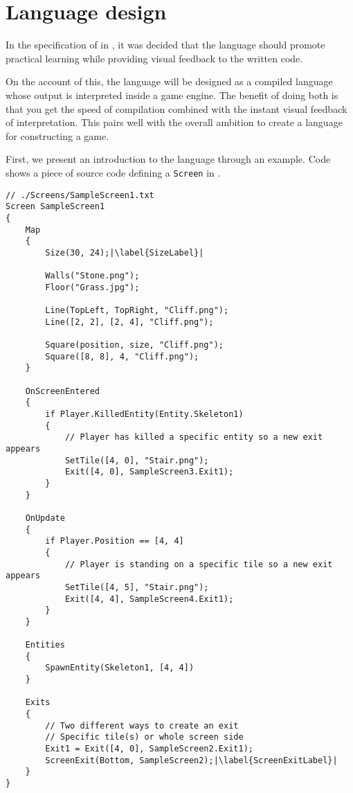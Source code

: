 \chapter{Language design}\label{chap:language_design}
In the specification of \dazel{} in , it was decided that the language should promote practical learning while providing visual feedback to the written code. 

On the account of this, the \dazel{} language will be designed as a compiled language whose output is interpreted inside a game engine.
The benefit of doing both is that you get the speed of compilation combined with the instant visual feedback of interpretation.
This pairs well with the overall ambition to create a language for constructing a game.

First, we present an introduction to the \dazel{} language through an example. Code  shows a piece of source code defining a \texttt{Screen} in \dazel{}.

\begin{lstlisting}[language=CSharp, caption={Example screen.}, label={lst:SampleScreen1},escapechar=|]
// ./Screens/SampleScreen1.txt
Screen SampleScreen1 
{
    Map 
    {
        Size(30, 24);|\label{SizeLabel}|

        Walls("Stone.png"); 
        Floor("Grass.jpg");

        Line(TopLeft, TopRight, "Cliff.png");
        Line([2, 2], [2, 4], "Cliff.png");

        Square(position, size, "Cliff.png");
        Square([8, 8], 4, "Cliff.png");
    }

    OnScreenEntered
    {
        if Player.KilledEntity(Entity.Skeleton1) 
        {
            // Player has killed a specific entity so a new exit appears
            SetTile([4, 0], "Stair.png");
            Exit([4, 0], SampleScreen3.Exit1);
        }
    }

    OnUpdate
    {
        if Player.Position == [4, 4] 
        {
            // Player is standing on a specific tile so a new exit appears
            SetTile([4, 5], "Stair.png");
            Exit([4, 4], SampleScreen4.Exit1);
        }
    }

    Entities
    {
        SpawnEntity(Skeleton1, [4, 4])
    }
    
    Exits 
    {
        // Two different ways to create an exit
        // Specific tile(s) or whole screen side
        Exit1 = Exit([4, 0], SampleScreen2.Exit1);
        ScreenExit(Bottom, SampleScreen2);|\label{ScreenExitLabel}|
    }
}
\end{lstlisting}

